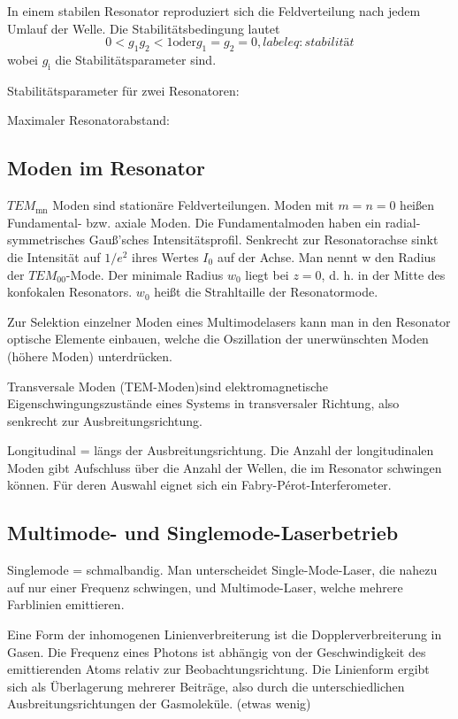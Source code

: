 In einem stabilen Resonator reproduziert sich die Feldverteilung nach jedem Umlauf der Welle.
Die Stabilitätsbedingung lautet
\begin{equation}
    0 < g_1 g_2 < 1 \text{oder} g_1 = g_2 = 0,
    label{eq:stabilität}
\end{equation}
wobei $g_\text{i}$ die Stabilitätsparameter sind.

Stabilitätsparameter für zwei Resonatoren:

Maximaler Resonatorabstand:


\subsection{Moden im Resonator}
%
$TEM_\text{mn}$ Moden sind stationäre Feldverteilungen.
Moden mit $m=n=0$ heißen Fundamental- bzw. axiale Moden.
Die Fundamentalmoden haben ein radial-symmetrisches Gauß’sches Intensitätsprofil. Senkrecht zur Resonatorachse sinkt die Intensität auf $1/e^2$ ihres Wertes $I_0$ auf der Achse. Man nennt w den Radius der $TEM_{00}$-Mode. Der minimale Radius $w_0$ liegt bei $z = 0$, d. h. in der Mitte des konfokalen Resonators.
$w_0$ heißt die Strahltaille der Resonatormode.

Zur Selektion einzelner Moden eines Multimodelasers kann man in den Resonator optische Elemente einbauen, welche die Oszillation der unerwünschten Moden (höhere Moden) unterdrücken.

Transversale Moden (TEM-Moden)sind elektromagnetische Eigenschwingungszustände eines Systems in transversaler Richtung, also senkrecht zur Ausbreitungsrichtung.

Longitudinal = längs der Ausbreitungsrichtung. 
Die Anzahl der longitudinalen Moden gibt Aufschluss über die Anzahl der Wellen, die im Resonator schwingen können.
Für deren Auswahl eignet sich ein Fabry-Pérot-Interferometer.



\subsection{Multimode- und Singlemode-Laserbetrieb}
Singlemode = schmalbandig.
Man unterscheidet Single-Mode-Laser, die nahezu auf nur einer Frequenz schwingen, und Multimode-Laser, welche mehrere Farblinien emittieren. 

Eine Form der inhomogenen Linienverbreiterung ist die Dopplerverbreiterung in Gasen. Die Frequenz eines Photons ist abhängig von der Geschwindigkeit des emittierenden Atoms relativ zur Beobachtungsrichtung. Die Linienform ergibt sich als Überlagerung mehrerer Beiträge, also durch die unterschiedlichen Ausbreitungsrichtungen der Gasmoleküle.
(etwas wenig)


